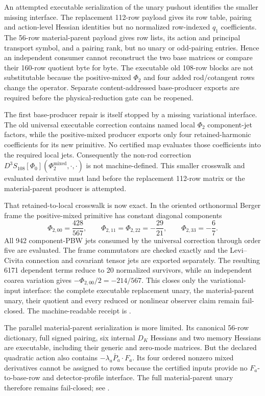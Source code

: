 \documentclass[11pt]{article}
\theoremstyle{definition}
\theoremstyle{remark}
\begin{document}
An attempted executable serialization of the unary pushout identifies the
smaller missing interface.  The replacement 112-row payload gives its row
table, pairing and action-level Hessian identities but no normalized
row-indexed $q_1$ coefficients.  The 56-row material-parent payload gives
row lists, its action and principal transport symbol, and a pairing rank, but
no unary or odd-pairing entries.  Hence an independent consumer cannot
reconstruct the two base matrices or compare their 160-row quotient byte for
byte.  The executable old 108-row blocks are not substitutable because the
positive-mixed $\Phi_2$ and four added rod/cotangent rows change the
operator.  Separate content-addressed base-producer exports are required
before the physical-reduction gate can be reopened.

The first base-producer repair is itself stopped by a missing variational
interface.  The old universal executable correction contains named local
$\Phi_2$ component-jet factors, while the positive-mixed producer exports
only four retained-harmonic coefficients for its new primitive.  No certified
map evaluates those coefficients into the required local jets.  Consequently
the non-rod correction
$D^3S_{108}[\Phi_0](\Phi_2^{\mathrm{mixed}},\cdot,\cdot)$
is not machine-defined.  This smaller crosswalk and evaluated derivative must
land before the replacement 112-row matrix or the material-parent producer is
attempted.

That retained-to-local crosswalk is now exact.  In the oriented orthonormal
Berger frame the positive-mixed primitive has constant diagonal components
\[
 \Phi_{2,00}=\frac{428}{567},\qquad
 \Phi_{2,11}=\Phi_{2,22}=-\frac{29}{21},\qquad
 \Phi_{2,33}=-\frac67 .
\]
All 942 component-PBW jets consumed by the universal correction through
order five are evaluated.  The frame commutators are checked exactly and the
Levi--Civita connection and covariant tensor jets are exported separately.
The resulting 6171 dependent terms reduce to 20 normalized survivors, while
an independent coarea variation gives
\(-\Phi_{2,00}/2=-214/567\).  This closes only the variational-input
interface: the complete executable replacement unary, the material-parent
unary, their quotient and every reduced or nonlinear observer claim remain
fail-closed.  The machine-readable receipt is
.

The parallel material-parent serialization is more limited.  Its canonical
56-row dictionary, full signed pairing, six internal \(D_K\) Hessians and
two memory Hessians are executable, including their generic and zero-mode
matrices.  But the declared quadratic action also contains
\(-\lambda_a\bar P_a\mathbin{\cdot}F_a\).  Its four ordered nonzero mixed
derivatives cannot be assigned to rows because the certified inputs provide
no \(F_a\)-to-base-row and detector-profile interface.  The full
material-parent unary therefore remains fail-closed; see
.
\end{document}

